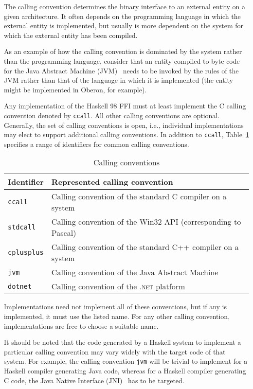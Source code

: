 \documentclass[a4paper,twosides]{article}
\newcommand{\code}[1]{\texttt{#1}}
\begin{document}
The calling convention determines the binary interface to an external entity
on a given architecture.  It often depends on the programming language in
which the external entity is implemented, but usually is more dependent on the
system for which the external entity has been compiled.

As an example of how the calling convention is dominated by the system rather
than the programming language, consider that an entity compiled to byte code
for the Java Abstract Machine (JVM)~\cite{lindholm-etal:JVM} needs to be
invoked by the rules of the JVM rather than that of the language in which it
is implemented (the entity might be implemented in Oberon, for example).

Any implementation of the Haskell 98 FFI must at least implement the C calling
convention denoted by \code{ccall}.  All other calling conventions are
optional.  Generally, the set of calling conventions is open, i.e., individual
implementations may elect to support additional calling conventions.  In
addition to \code{ccall}, Table~\ref{tab:callconv} specifies a range of
identifiers for common calling conventions.
%
\begin{table}[tbp]
  \begin{center}
    \begin{tabular}{|l|l|}
      \hline
      Identifier & Represented calling convention\\
      \hline\hline
      \code{ccall} 
      & Calling convention of the standard C compiler on a system\\
      \code{stdcall}
      & Calling convention of the Win32 API (corresponding to Pascal)\\
      \code{cplusplus}
      & Calling convention of the standard C{+}{+} compiler on a system\\
      \code{jvm} 
      & Calling convention of the Java Abstract Machine\\
      \code{dotnet}
      & Calling convention of the \textsc{.net} platform\\
      \hline
    \end{tabular}
    \caption{Calling conventions}
    \label{tab:callconv}
  \end{center}
\end{table}
%
Implementations need not implement all of these conventions, but if any is
implemented, it must use the listed name.  For any other calling convention,
implementations are free to choose a suitable name.

It should be noted that the code generated by a Haskell system to implement a
particular calling convention may vary widely with the target code of that
system.  For example, the calling convention \code{jvm} will be trivial to
implement for a Haskell compiler generating Java code, whereas for a Haskell
compiler generating C code, the Java Native Interface (JNI)~\cite{liang:JNI}
has to be targeted.
\end{document}

